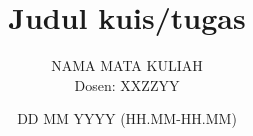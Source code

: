 \documentclass[12pt]{article}
\newenvironment{problem}[2][Problem]{\begin{trivlist}%
		\item[\hskip \labelsep {\bfseries #1}\hskip \labelsep {\bfseries #2.}]}{\end{trivlist}}
\begin{document}
	\renewcommand{\labelenumi}{(\alph{enumi})} %
	
	\title{Judul kuis/tugas}
	\author{NAMA MATA KULIAH\\ Dosen: XXZZYY}%
	\date{DD MM YYYY (HH.MM-HH.MM)}%
	\maketitle
	
	\begin{center}
	\end{center}
	\pagebreak
	
	\begin{problem}[Soal]{1} 
		\blindtext
	\end{problem}
	
	\begin{problem}[Soal]{2}
		\blindtext
	\end{problem}
\end{document}
